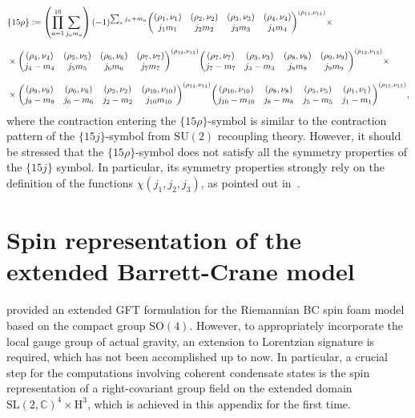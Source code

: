 \documentclass[11pt,a4paper]{article}
\newcommand{\C}{\mathbb C}
\newcommand{\SU}{\text{SU$(2)$}}
\newcommand{\SL}{\text{SL$(2,\C)$}}
\newcommand{\HH}{\text{H}^3}
\newcommand{\defeq}{\vcentcolon=}
\begin{document}
\begin{equation}\label{eq:definition of SL2C 15p symbol}
\begin{aligned}
& \{15\rho\}\defeq
\left(\prod_{a=1}^{10}\sum_{j_a m_a}\right)(-1)^{\sum_a j_a+m_a}
\mqty((\rho_1,\nu_1) & (\rho_2,\nu_2) & (\rho_3,\nu_3) & (\rho_4,\nu_4) \\ j_1 m_1 & j_2 m_2 & j_3 m_3 & j_4 m_4)^{(\rho_{11},\nu_{11})}\times\\[7pt]
& \times
\mqty((\rho_4,\nu_4) & (\rho_5,\nu_5) & (\rho_6,\nu_6) & (\rho_7,\nu_7) \\ j_4 -m_4 & j_5 m_5 & j_6 m_6 & j_7 m_7)^{(\rho_{12},\nu_{12})}
\mqty((\rho_7,\nu_7) & (\rho_3,\nu_3) & (\rho_8,\nu_8) & (\rho_9,\nu_9) \\ j_7 -m_7 & j_3 -m_3 & j_8 m_8 & j_9 m_9)^{(\rho_{13},\nu_{13})}\times\\[7pt]
& \times
\mqty((\rho_9,\nu_9) & (\rho_6,\nu_6) & (\rho_2,\nu_2) & (\rho_{10},\nu_{10}) \\ j_9 -m_9 & j_6 -m_6 & j_2 -m_2 & j_{10} m_{10})^{(\rho_{14},\nu_{14})}
\mqty((\rho_{10},\nu_{10}) & (\rho_8,\nu_8) & (\rho_5,\nu_5) & (\rho_1,\nu_1) \\ j_{10} -m_{10} & j_8 -m_8 & j_5 -m_5 & j_1 -m_1)^{(\rho_{15},\nu_{15})},
\end{aligned}
\end{equation}
%
where the contraction entering the $\{15\rho\}$-symbol is similar to the contraction pattern of the $\{15j\}$-symbol from $\SU$ recoupling theory. However, it should be stressed that the $\{15\rho\}$-symbol does not satisfy all the symmetry properties of the $\{15j\}$ symbol. In particular, its symmetry properties strongly rely on the definition of the functions $\chi(j_1,j_2,j_3)$, as pointed out in~\cite{Speziale:2016axj}.

\section{Spin representation of the extended Barrett-Crane model}\label{appendix:Spin representation of the extended BC model}

\cite{Baratin:2011tx} provided an extended GFT formulation for the Riemannian BC spin foam model based on the compact group SO$(4)$. However, to appropriately incorporate the local gauge group of actual gravity, an extension to Lorentzian signature is required, which has not been accomplished up to now. In particular, a crucial step for the computations involving coherent condensate states is the spin representation of a right-covariant group field on the extended domain $\SL^4\times\HH$, which is achieved in this appendix for the first time.
\end{document}
